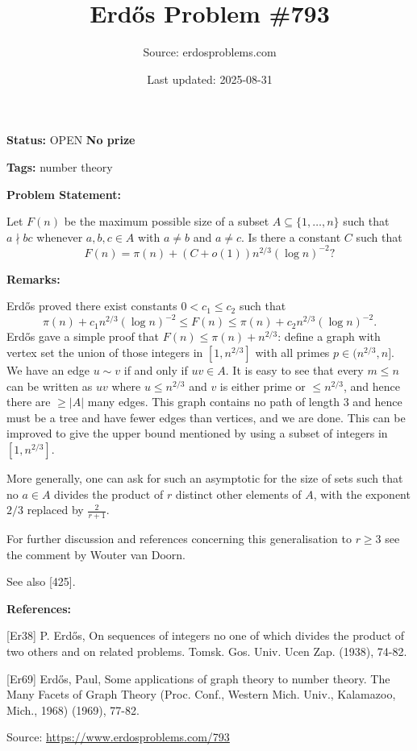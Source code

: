 \documentclass{article}
\title{Erd\H{o}s Problem \#793}
\date{Last updated: 2025-08-31}
\author{Source: erdosproblems.com}
\begin{document}
\maketitle

\noindent\textbf{Status:} OPEN \quad \textbf{No prize}

\noindent\textbf{Tags:} number theory

\medskip
\noindent\textbf{Problem Statement:}

Let $F(n)$ be the maximum possible size of a subset $A\subseteq\{1,\ldots,n\}$ such that $a\nmid bc$ whenever $a,b,c\in A$ with $a\neq b$ and $a\neq c$. Is there a constant $C$ such that\[F(n)=\pi(n)+(C+o(1))n^{2/3}(\log n)^{-2}?\]

\bigskip
\noindent\textbf{Remarks:}

Erd\H{o}s \cite{Er38} proved there exist constants $0<c_1\leq c_2$ such that\[\pi(n)+c_1n^{2/3}(\log n)^{-2}\leq F(n) \leq \pi(n)+c_2n^{2/3}(\log n)^{-2}.\]Erd\H{o}s \cite{Er69} gave a simple proof that $F(n) \leq \pi(n)+n^{2/3}$: define a graph with vertex set the union of those integers in $[1,n^{2/3}]$ with all primes $p\in (n^{2/3},n]$. We have an edge $u\sim v$ if and only if $uv\in A$. It is easy to see that every $m\leq n$ can be written as $uv$ where $u\leq n^{2/3}$ and $v$ is either prime or $\leq n^{2/3}$, and hence there are $\geq \lvert A\rvert$ many edges. This graph contains no path of length $3$ and hence must be a tree and have fewer edges than vertices, and we are done. This can be improved to give the upper bound mentioned by using a subset of integers in $[1,n^{2/3}]$.

More generally, one can ask for such an asymptotic for the size of sets such that no $a\in A$ divides the product of $r$ distinct other elements of $A$, with the exponent $2/3$ replaced by $\frac{2}{r+1}$.

For further discussion and references concerning this generalisation to $r\geq 3$ see the comment by Wouter van Doorn.

See also [425].

\bigskip
\noindent\textbf{References:}

[Er38] P. Erd\H{o}s, On sequences of integers no one of which divides the product of two others and on related problems. Tomsk. Gos. Univ. Ucen Zap. (1938), 74-82.
 
 [Er69] Erd\H{o}s, Paul, Some applications of graph theory to number theory. The Many Facets of Graph Theory (Proc. Conf.,
Western Mich. Univ., Kalamazoo, Mich., 1968) (1969), 77-82.

\bigskip
\noindent\small{Source: \url{https://www.erdosproblems.com/793}}
\end{document}
